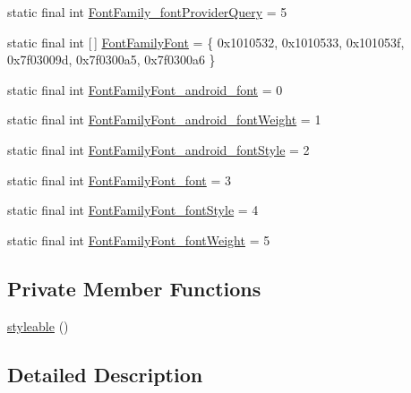 \begin{DoxyCompactItemize}
static final int \mbox{\hyperlink{classandroid_1_1support_1_1graphics_1_1drawable_1_1animated_1_1_r_1_1styleable_a86c4d4d58391ae3f1849a8099767a90f}{Font\+Family\+\_\+font\+Provider\+Query}} = 5
\item 
static final int \mbox{[}$\,$\mbox{]} \mbox{\hyperlink{classandroid_1_1support_1_1graphics_1_1drawable_1_1animated_1_1_r_1_1styleable_a08ce118a05b234b4bce3be83d4baa78f}{Font\+Family\+Font}} = \{ 0x1010532, 0x1010533, 0x101053f, 0x7f03009d, 0x7f0300a5, 0x7f0300a6 \}
\item 
static final int \mbox{\hyperlink{classandroid_1_1support_1_1graphics_1_1drawable_1_1animated_1_1_r_1_1styleable_ad75afbb321d8fae6030d32cb021ec4f9}{Font\+Family\+Font\+\_\+android\+\_\+font}} = 0
\item 
static final int \mbox{\hyperlink{classandroid_1_1support_1_1graphics_1_1drawable_1_1animated_1_1_r_1_1styleable_a03ede313e154adec2303e6f7784d5dfb}{Font\+Family\+Font\+\_\+android\+\_\+font\+Weight}} = 1
\item 
static final int \mbox{\hyperlink{classandroid_1_1support_1_1graphics_1_1drawable_1_1animated_1_1_r_1_1styleable_a59fc404404f11efe03a08731a5d84a62}{Font\+Family\+Font\+\_\+android\+\_\+font\+Style}} = 2
\item 
static final int \mbox{\hyperlink{classandroid_1_1support_1_1graphics_1_1drawable_1_1animated_1_1_r_1_1styleable_a74b0523de105a9fc3d47d94313aa161c}{Font\+Family\+Font\+\_\+font}} = 3
\item 
static final int \mbox{\hyperlink{classandroid_1_1support_1_1graphics_1_1drawable_1_1animated_1_1_r_1_1styleable_a638b775651df13e5da3be65e17051488}{Font\+Family\+Font\+\_\+font\+Style}} = 4
\item 
static final int \mbox{\hyperlink{classandroid_1_1support_1_1graphics_1_1drawable_1_1animated_1_1_r_1_1styleable_a48249eba6fdf1b4b5c0745b92e201681}{Font\+Family\+Font\+\_\+font\+Weight}} = 5
\end{DoxyCompactItemize}
\subsection*{Private Member Functions}
\begin{DoxyCompactItemize}
\item 
\mbox{\hyperlink{classandroid_1_1support_1_1graphics_1_1drawable_1_1animated_1_1_r_1_1styleable_af3c9675a6a601e7cf492f53bf65d431e}{styleable}} ()
\end{DoxyCompactItemize}


\subsection{Detailed Description}


